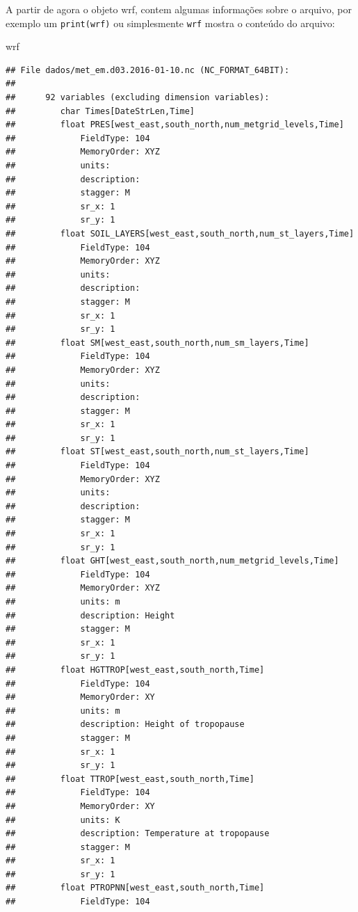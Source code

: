 \documentclass[]{book}
\newenvironment{Shaded}{\begin{snugshade}}{\end{snugshade}}
\newcommand{\NormalTok}[1]{#1}
\theoremstyle{definition}
\theoremstyle{definition}
\theoremstyle{definition}
\theoremstyle{remark}
\begin{document}
A partir de agora o objeto wrf, contem algumas informações sobre o
arquivo, por exemplo um \texttt{print(wrf)} ou simplesmente \texttt{wrf}
mostra o conteúdo do arquivo:

\begin{Shaded}
\begin{Highlighting}[]
\NormalTok{wrf}
\end{Highlighting}
\end{Shaded}

\begin{verbatim}
## File dados/met_em.d03.2016-01-10.nc (NC_FORMAT_64BIT):
## 
##      92 variables (excluding dimension variables):
##         char Times[DateStrLen,Time]   
##         float PRES[west_east,south_north,num_metgrid_levels,Time]   
##             FieldType: 104
##             MemoryOrder: XYZ
##             units: 
##             description: 
##             stagger: M
##             sr_x: 1
##             sr_y: 1
##         float SOIL_LAYERS[west_east,south_north,num_st_layers,Time]   
##             FieldType: 104
##             MemoryOrder: XYZ
##             units: 
##             description: 
##             stagger: M
##             sr_x: 1
##             sr_y: 1
##         float SM[west_east,south_north,num_sm_layers,Time]   
##             FieldType: 104
##             MemoryOrder: XYZ
##             units: 
##             description: 
##             stagger: M
##             sr_x: 1
##             sr_y: 1
##         float ST[west_east,south_north,num_st_layers,Time]   
##             FieldType: 104
##             MemoryOrder: XYZ
##             units: 
##             description: 
##             stagger: M
##             sr_x: 1
##             sr_y: 1
##         float GHT[west_east,south_north,num_metgrid_levels,Time]   
##             FieldType: 104
##             MemoryOrder: XYZ
##             units: m
##             description: Height
##             stagger: M
##             sr_x: 1
##             sr_y: 1
##         float HGTTROP[west_east,south_north,Time]   
##             FieldType: 104
##             MemoryOrder: XY 
##             units: m
##             description: Height of tropopause
##             stagger: M
##             sr_x: 1
##             sr_y: 1
##         float TTROP[west_east,south_north,Time]   
##             FieldType: 104
##             MemoryOrder: XY 
##             units: K
##             description: Temperature at tropopause
##             stagger: M
##             sr_x: 1
##             sr_y: 1
##         float PTROPNN[west_east,south_north,Time]   
##             FieldType: 104

\end{verbatim}
\end{document}
